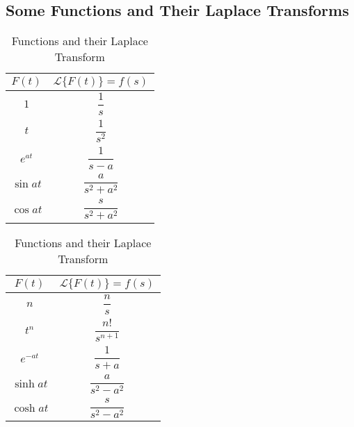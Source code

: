 \documentclass[12pt]{article}
\newcommand{\Lap}{\mathscr{L}}
\begin{document}
\subsection{Some Functions and Their Laplace Transforms}

\begin{table}[htpb]
    \centering

    \begin{tabular}{c | c}
        \hline
        $F(t)$ &  $\Lap\{ F(t) \} = f(s)$ \\
        \hline\hline
        $1$ & $\dfrac{1}{s}$ \\\hline
        $t$ & $\dfrac{1}{s^2}$ \\\hline
        $e^{at}$ & $\dfrac{1}{s-a}$ \\\hline
        $\sin{at}$ & $\dfrac{a}{s^2+a^2}$ \\\hline
        $\cos{at}$ & $\dfrac{s}{s^2+a^2}$ \\
        \hline
    \end{tabular}
    \begin{tabular}{c | c}
        \hline
        $F(t)$ &  $\Lap\{ F(t) \} = f(s)$ \\
        \hline\hline
        $n$ & $\dfrac{n}{s}$ \\\hline
        $t^n$ &  $\dfrac{n!}{s^{n+1}}$ \\\hline
        $e^{-at}$ & $\dfrac{1}{s+a}$ \\\hline
        $\sinh{at}$ & $\dfrac{a}{s^2-a^2}$ \\\hline
        $\cosh{at}$ &  $\dfrac{s}{s^2-a^2}$ \\
        \hline
    \end{tabular}

    \caption{Functions and their Laplace Transform}
    \label{LapTable}
\end{table}
\end{document}
